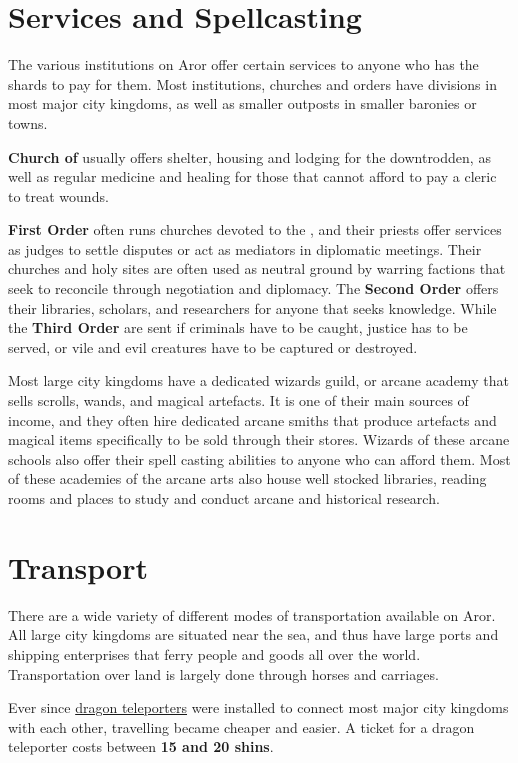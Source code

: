 \section{Services and Spellcasting}
\label{sec:Services}

The various institutions on Aror offer certain services to anyone who has the
shards to pay for them. Most institutions, churches and orders have divisions
in most major city kingdoms, as well as smaller outposts in smaller baronies
or towns.

\textbf{Church of } usually offers shelter, housing and
lodging for the downtrodden, as well as regular medicine and healing for those
that cannot afford to pay a cleric to treat wounds.

\textbf{First Order} often runs churches devoted to the ,
and their priests offer services as judges to settle disputes or act as
mediators in diplomatic meetings. Their churches and holy sites are often
used as neutral ground by warring factions that seek to reconcile through
negotiation and diplomacy. The \textbf{Second Order} offers their libraries,
scholars, and researchers for anyone that seeks knowledge. While the
\textbf{Third Order} are sent if criminals have to be caught, justice has to
be served, or vile and evil creatures have to be captured or destroyed.

Most large city kingdoms have a dedicated wizards guild, or arcane academy
that sells scrolls, wands, and magical artefacts. It is one of their main
sources of income, and they often hire dedicated arcane smiths that produce
artefacts and magical items specifically to be sold through their stores.
Wizards of these arcane schools also offer their spell casting abilities to
anyone who can afford them. Most of these academies of the arcane arts also
house well stocked libraries, reading rooms and places to study and conduct
arcane and historical research.

\section{Transport}
\label{sec:Transport}

There are a wide variety of different modes of transportation available on
Aror. All large city kingdoms are situated near the sea, and thus have large
ports and shipping enterprises that ferry people and goods all over the
world. Transportation over land is largely done through horses and carriages.

Ever since \hyperref[sec:Dragon Teleporter]{dragon teleporters} were installed
to connect most major city kingdoms with each other, travelling became cheaper
and easier. A ticket for a dragon teleporter costs between \textbf{15 and 20
  shins}.
